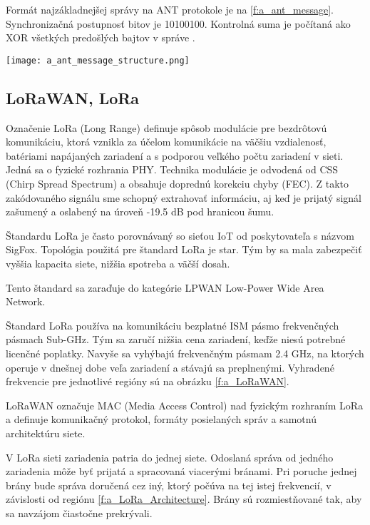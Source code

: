 \documentclass[12pt,a4paper,oneside,openright]{report}
\begin{document}
Formát najzákladnejšej správy na ANT protokole je na \ref{f:a_ant_message}. Synchronizačná postupnosť bitov je 10100100. Kontrolná suma je počítaná ako XOR všetkých predošlých bajtov v správe \cite{ANT}.

\begin{figure*}[h!]
	\centering
	\texttt{[image: a\_ant\_message\_structure.png]}
\caption{Najjednoduchší formát správy protokolu ANT\cite{ANT}.}
\label{f:a_ant_message}
\end{figure*}

\subsection{LoRaWAN, LoRa}
Označenie LoRa (Long Range) definuje spôsob modulácie pre bezdrôtovú komunikáciu, ktorá vznikla za účelom komunikácie na väčšiu vzdialenosť, batériami napájaných zariadení a s podporou veľkého počtu zariadení v sieti. Jedná sa o fyzické rozhrania PHY. Technika modulácie je odvodená od CSS (Chirp Spread Spectrum) a obsahuje doprednú korekciu chyby (FEC). Z takto zakódovaného signálu sme schopný extrahovať informáciu, aj keď je prijatý signál zašumený a oslabený na úroveň -19.5 dB pod hranicou šumu.

Štandardu LoRa je často porovnávaný so sieťou IoT od poskytovateľa s názvom SigFox. Topológia použitá pre štandard LoRa je star. Tým by sa mala zabezpečiť vyššia kapacita siete, nižšia spotreba a väčší dosah\cite{LoRaSpec}\cite{LoRaFAQ}.

Tento štandard sa zaraďuje do kategórie LPWAN Low-Power Wide Area Network. 

Štandard LoRa používa na komunikáciu bezplatné ISM pásmo frekvenčných pásmach Sub-GHz. Tým sa zaručí nižšia cena zariadení, keďže niesú potrebné licenčné poplatky. Navyše sa vyhýbajú frekvenčným pásmam 2.4 GHz, na ktorých operuje v dnešnej dobe veľa zariadení a stávajú sa preplnenými. Vyhradené frekvencie pre jednotlivé regióny sú na obrázku \ref{f:a_LoRaWAN}.

LoRaWAN označuje MAC (Media Access Control) nad fyzickým rozhraním LoRa a definuje komunikačný protokol, formáty posielaných správ a samotnú architektúru siete.

V LoRa sieti zariadenia patria do jednej siete. Odoslaná správa od jedného zariadenia môže byť prijatá a spracovaná viacerými bránami. Pri poruche jednej brány bude správa doručená cez iný, ktorý počúva na tej istej frekvencií, v závislosti od regiónu \ref{f:a_LoRa_Architecture}. Brány sú rozmiestňované tak, aby sa navzájom čiastočne prekrývali.
\end{document}

